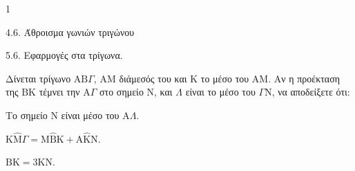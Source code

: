 \begin{ylh}{1}
    \item 4.6. Άθροισμα γωνιών τριγώνου
    \item 5.6. Εφαρμογές στα τρίγωνα.
\end{ylh}
Δίνεται τρίγωνο $\mathrm{A}\mathrm{B}\Gamma$, $\mathrm{A}\mathrm{M}$ διάμεσός του και $\mathrm{K}$ το μέσο του $\mathrm{A}\mathrm{M}$. Αν η προέκταση της $\mathrm{B}\mathrm{K}$ τέμνει την $\mathrm{A}\Gamma$ στο σημείο $\mathrm{N}$, και $\Lambda$ είναι το μέσο του $\Gamma\mathrm{N}$, να αποδείξετε ότι:
\begin{alist}
    \item Το σημείο $\mathrm{N}$ είναι μέσο του $\mathrm{A}\Lambda$. 
    \item $\mathrm{K}\hat{\mathrm{M}}\Gamma = \mathrm{M}\hat{\mathrm{B}}\mathrm{K} + \mathrm{A}\hat{\mathrm{K}}\mathrm{N}$. 
    \item $\mathrm{B}\mathrm{K} = 3\mathrm{K}\mathrm{N}$. 
\end{alist}
